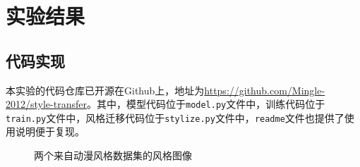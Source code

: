 \documentclass[UTF8,openany]{ctexbook}
\begin{document}
\chapter{实验结果}

\section{代码实现}

本实验的代码仓库已开源在Github上，地址为\url{https://github.com/Mingle-2012/style-transfer}。其中，模型代码位于\texttt{model.py}文件中，训练代码位于\texttt{train.py}文件中，风格迁移代码位于\texttt{stylize.py}文件中，\texttt{readme}文件也提供了使用说明便于复现。

\begin{figure}[h!]
    \centering
    \caption{两个来自动漫风格数据集的风格图像}
    \label{fig:styles}
\end{figure}
\end{document}
